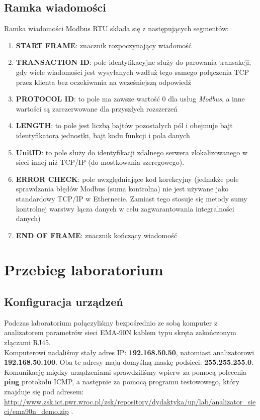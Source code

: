 \documentclass[12pt]{article}
\begin{document}
\subsection{Ramka wiadomości}
Ramka wiadomości Modbus RTU składa się z następujących segmentów:
\begin{enumerate}
    \item \textbf{START FRAME}: znacznik rozpoczynający wiadomość
    \item \textbf{TRANSACTION ID}: pole identyfikacyjne służy do parowania transakcji, gdy wiele wiadomości jest wysyłanych wzdłuż tego samego połączenia TCP przez klienta bez oczekiwania na wcześniejszą odpowiedź
    \item \textbf{PROTOCOL ID}: to pole ma zawsze wartość 0 dla usług \textit{Modbus}, a inne wartości są zarezerwowane dla przyszłych rozszerzeń
    \item \textbf{LENGTH}: to pole jest liczbą bajtów pozostałych pól i obejmuje
bajt identyfikatora jednostki, bajt kodu funkcji i pola danych
    \item \textbf{UnitID}: to pole służy do identyfikacji zdalnego serwera zlokalizowanego w sieci innej niż TCP/IP (do mostkowania szeregowego).
    \item \textbf{ERROR CHECK}: pole uwzględniające kod korekcyjny (jednakże
pole sprawdzania błędów Modbus (suma kontrolna) nie jest używane jako standardowy TCP/IP w Ethernecie. Zamiast tego stosuje się metody sumy kontrolnej warstwy łącza danych w celu zagwarantowania integralności danych)
    \item \textbf{END OF FRAME}: znacznik kończący wiadomość
\end{enumerate}
\section{Przebieg laboratorium}
\subsection{Konfiguracja urządzeń}
Podczas laboratorium połączyliśmy bezpośrednio ze sobą komputer z analizatorem parametrów sieci EMA-90N kablem typu skręta zakończonym złączami RJ45.\\
Komputerowi nadaliśmy stały adres IP: \textbf{192.168.50.50}, natomiast analizatorowi \textbf{192.168.50.100}. Oba te adresy mają domyślną maskę podsieci: \textbf{255.255.255.0}. Komunikację między urządzeniami sprawdziliśmy wpierw za pomocą polecenia \textbf{ping} protokołu ICMP, a następnie za pomocą programu testowowego, który znajduje się pod adresem: \url{http://www.zsk.ict.pwr.wroc.pl/zsk/repository/dydaktyka/up/lab/analizator_sieci/ema90n_demo.zip} .
\end{document}

